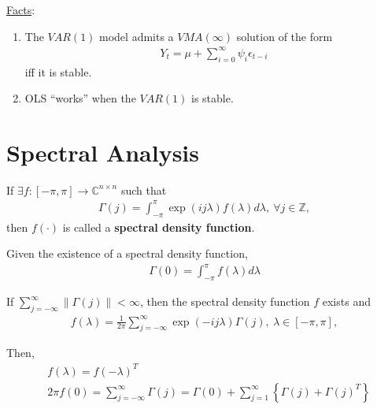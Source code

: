 \documentclass[11pt]{elegantbook}
\begin{document}
\underline{Facts}:
\begin{enumerate}
    \item The $VAR(1)$ model admits a $VMA(\infty)$ solution of the form
    \begin{equation}
        \begin{aligned}
            Y_t=\mu+\sum_{i=0}^\infty\psi_i\epsilon_{t-i}
        \end{aligned}
        \nonumber
    \end{equation}
    iff it is stable.
    \item OLS ``works'' when the $VAR(1)$ is stable.
\end{enumerate}

\section{Spectral Analysis}
\begin{definition}
    If $\exists f:[-\pi, \pi] \rightarrow \mathbb{C}^{n\times n}$ such that
    \begin{equation}
        \begin{aligned}
            \Gamma(j)=\int_{-\pi}^\pi \exp\left(ij\lambda\right)f(\lambda)d \lambda,\ \forall j\in \mathbb{Z},
        \end{aligned}
        \nonumber
    \end{equation}
    then $f(\cdot)$ is called a \textbf{spectral density function}.
\end{definition}
Given the existence of a spectral density function,
\begin{equation}
    \begin{aligned}
        \Gamma(0)=\int_{-\pi}^\pi f(\lambda)d\lambda
    \end{aligned}
    \nonumber
\end{equation}

\begin{lemma}
    If $\sum_{j=-\infty}^\infty \|\Gamma(j)\|<\infty$, then the spectral density function $f$ exists and
    \begin{equation}
        \begin{aligned}
            f(\lambda)=\frac{1}{2\pi}\sum_{j=-\infty}^\infty \exp\left(-ij\lambda\right)\Gamma(j),\ \lambda\in[-\pi, \pi],
        \end{aligned}
        \nonumber
    \end{equation}
\end{lemma}
Then,
\begin{equation}
    \begin{aligned}
        &f(\lambda) = f(-\lambda)^T\\
        &2\pi f(0) = \sum_{j=-\infty}^\infty \Gamma(j) = \Gamma(0) + \sum_{j=1}^\infty \left\{\Gamma(j)+\Gamma(j)^T\right\}
    \end{aligned}
    \nonumber
\end{equation}
\end{document}
